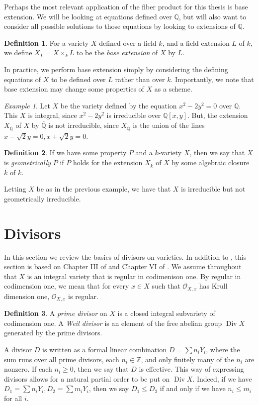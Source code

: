 \documentclass[12pt,twoside]{reedthesis}
\theoremstyle{plain}
\theoremstyle{definition}
\newtheorem{definition}{Definition}[section]
\theoremstyle{remark}
\newtheorem{example}{Example}[section]
\newcommand{\ZZ}{\mathbb{Z}}
\newcommand{\QQ}{\mathbb{Q}}
\newcommand{\calO}{\mathcal{O}}
\newcommand{\Div}{\operatorname{Div}}
\begin{document}
Perhaps the most relevant application of the fiber product for this thesis is base extension. We will be looking at equations defined over $\QQ$, but will also want to consider all possible solutions to those equations by looking to extensions of $\QQ$.
\begin{definition}
For a variety $X$ defined over a field $k$, and a field extension $L$ of $k$, we define $X_L=X\times_k L$ to be the \emph{base extension} of $X$ by $L$.
\end{definition}
\noindent In practice, we perform base extension simply by considering the defining equations of $X$ to be defined over $L$ rather than over $k$. Importantly, we note that base extension may change some properties of $X$ as a scheme.

\begin{example}
Let $X$ be the variety defined by the equation $x^2-2y^2=0$ over $\QQ$. This $X$ is integral, since $x^2-2y^2$ is irreducible over $\QQ[x,y]$. But, the extension $X_{\overline{\QQ}}$ of $X$ by $\overline{\QQ}$ is not irreducible, since $X_{\overline{\QQ}}$ is the union of the lines $x-\sqrt{2}y=0, x+\sqrt{2}y=0$.
\end{example}

\begin{definition}
If we have some property $P$ and a $k$-variety $X$, then we say that $X$ is \emph{geometrically} $P$ if $P$ holds for the extension $X_{\overline{k}}$ of $X$ by some algebraic closure $\overline{k}$ of $k$.
\end{definition}
\noindent Letting $X$ be as in the previous example, we have that $X$ is irreducible but not geometrically irreducible.

\section{Divisors}
In this section we review the basics of divisors on varieties. In addition to \cite{hartshorne}, this section is based on Chapter III of \cite{shafarevichVol1} and Chapter VI of \cite{shafarevichVol2}. We assume throughout that $X$ is an integral variety that is regular in codimenison one. By regular in codimension one, we mean that for every $x\in X$ such that $\calO_{X,x}$ has Krull dimension one, $\calO_{X,x}$ is regular.

\begin{definition}
A \emph{prime divisor} on $X$ is a closed integral subvariety of codimension one. A \emph{Weil divisor} is an element of the free abelian group $\Div X$ generated by the prime divisors. 
\end{definition}
A divisor $D$ is written as a formal linear combination $D=\sum n_i Y_i$, where the sum runs over all prime divisors, each $n_i\in\ZZ$, and only finitely many of the $n_i$ are nonzero. If each $n_i\geq 0$, then we say that $D$ is effective. This way of expressing divisors allows for a natural partial order to be put on $\Div X$. Indeed, if we have $D_1=\sum n_i Y_i, D_2=\sum m_i Y_i$, then we say $D_1\leq D_2$ if and only if we have $n_i\leq m_i$ for all $i$.
\end{document}
